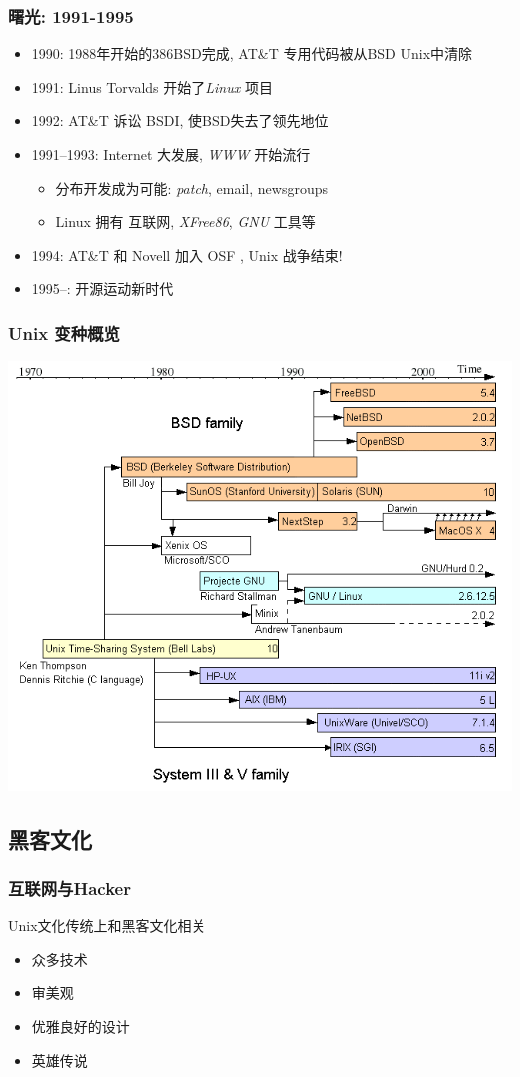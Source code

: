 \documentclass[compress]{beamer}
\begin{document}
\begin{frame}
\frametitle{曙光: 1991-1995}
\begin{itemize}
\item 1990: 1988年开始的386BSD完成, AT\&T 专用代码被从BSD Unix中清除
\item 1991: Linus Torvalds 开始了\emph{Linux} 项目
\item 1992: AT\&T 诉讼 BSDI, 使BSD失去了领先地位
\item 1991--1993: Internet 大发展, \emph{WWW} 开始流行
    \begin{itemize}
        \item 分布开发成为可能: \emph{patch}, email, newsgroups
        \item Linux 拥有 互联网, \emph{XFree86}, \emph{GNU} 工具等
    \end{itemize}
\item 1994: AT\&T 和 Novell 加入 OSF , Unix 战争结束!
\item 1995--: 开源运动新时代
\end{itemize}
\end{frame}

\begin{frame}
\frametitle{Unix 变种概览}
\includegraphics[width=0.8\hsize]{Unix_family.png}
\end{frame}

\subsection{黑客文化}

\begin{frame}
\frametitle{互联网与Hacker}
\begin{block}{Unix文化传统上和黑客文化相关}
\begin{itemize}
    \item 众多技术
    \item 审美观
	\item 优雅良好的设计
    \item 英雄传说
\end{itemize}
\end{block}

\end{frame}
\end{document}
